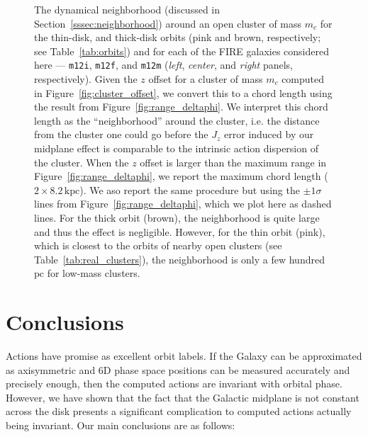 \documentclass[twocolumn]{aastex62}
\newcommand{\pc}{\text{pc}}
\newcommand{\kpc}{\text{kpc}}
\newcommand{\mi}{\texttt{m12i}}
\newcommand{\mf}{\texttt{m12f}}
\newcommand{\mm}{\texttt{m12m}}
\newcommand{\thincolor}{pink}
\newcommand{\thickcolor}{brown}
\begin{document}
\begin{figure}
\caption{The dynamical neighborhood (discussed in
Section~\ref{sssec:neighborhood}) around an open cluster of mass $m_c$ for the
thin-disk, and thick-disk orbits (\thincolor{} and \thickcolor{},
respectively; see Table~\ref{tab:orbits}) and for each of the FIRE galaxies
considered here ---
\mi{}, \mf{}, and \mm{} ({\em left}, {\em center}, and {\em right} panels,
respectively). Given the $z$ offset for a cluster of mass $m_c$ computed in
Figure~\ref{fig:cluster_offset}, we convert this to a chord length using the
result from Figure~\ref{fig:range_deltaphi}. We interpret this chord length as
the ``neighborhood'' around the cluster, i.e. the distance from the cluster
one could go before the $J_z$ error induced by our midplane effect is
comparable to the intrinsic action dispersion of the cluster. When the $z$
offset is larger than the maximum range in Figure~\ref{fig:range_deltaphi}, we
report the maximum chord length ($2\times8.2\,\kpc$). We aso report the same
procedure but using the $\pm1\sigma$ lines from
Figure~\ref{fig:range_deltaphi}, which we plot here as dashed lines. For the
thick orbit (\thickcolor), the neighborhood is quite large and thus the effect
is negligible. However, for the thin orbit (\thincolor), which is closest to
the orbits of nearby open clusters (see Table~\ref{tab:real_clusters}), the
neighborhood is only a few hundred $\pc$ for low-mass clusters.}
\label{fig:Rn_mc}
\end{figure}

\section{Conclusions}\label{sec:conclusion}
Actions have promise as excellent orbit labels. If the Galaxy can be
approximated as axisymmetric and 6D phase space positions can be measured
accurately and precisely enough, then the computed actions are invariant with
orbital phase. However, we have shown that the fact that the Galactic midplane
is not constant across the disk presents a significant complication to
computed actions actually being invariant. Our main conclusions are as
follows:
\end{document}

